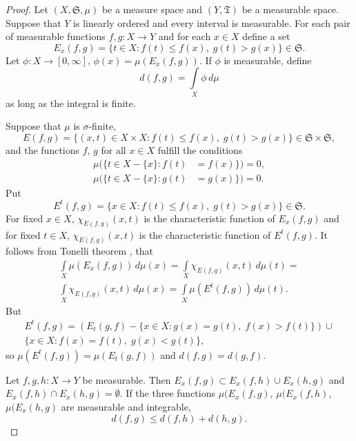 \begin{note}
\end{note}
\begin{proof}
Let $(X, \mathfrak{S}, \mu)$ be a measure space and $(Y,
\mathfrak{T})$ be a measurable space. Suppose that $Y$ is linearly
ordered and every interval is measurable. For each pair of measurable
functions $f, g \colon X \to Y$ and for each $x \in X$ define a set
\begin{equation*}
  E_x(f, g) = \{t \in X \colon f(t) \leq f(x), \; g(t) > g(x)\} \in
  \mathfrak{S}.
\end{equation*}
Let $\phi \colon X \to [0, \infty]$, $\phi(x) = \mu(E_x(f, g))$. If
$\phi$ is measurable, define
\begin{equation*}
  d(f, g) = \int \limits_{X} \phi \, d\mu
\end{equation*}
as long as the integral is finite.

Suppose that $\mu$ is $\sigma$-finite,
\begin{equation*}
  E(f, g) = \{(x, t) \in X \times X \colon f(t) \leq f(x), \; g(t) >
  g(x)\} \in \mathfrak{S} \times \mathfrak{S},
\end{equation*}
and the functions $f$, $g$ for all $x \in X$ fulfill the conditions
\begin{align*}
  \mu(\{t \in X - \{x\} \colon f(t) &= f(x)\}) = 0, \\
  \mu(\{t \in X - \{x\} \colon g(t) &= g(x)\}) = 0.
\end{align*}
Put
\begin{equation*}
  E^t(f, g) = \{x \in X \colon f(t) \leq f(x), \; g(t) > g(x)\} \in
  \mathfrak{S}.
\end{equation*}
For fixed $x \in X$, $\chi_{E(f, g)}(x, t)$ is the characteristic
function of $E_x(f, g)$ and for fixed $t \in X$, $\chi_{E(f, g)}(x,
t)$ is the characteristic function of $E^t(f, g)$. It follows from
Tonelli theorem \cite [\S7.6, \S7.8] {rudin-1986}, \cite [p.~231]
{billingsley-2009} that
\begin{equation*}
  \begin{split}
    \int \limits_{X} \mu(E_x(f, g)) \, d\mu(x) =
    \int \limits_{X} \chi_{E(f, g)}(x, t) \, d\mu(t) = \\
    \int \limits_{X} \chi_{E(f, g)}(x, t) \, d\mu(x) =
    \int \limits_{X} \mu(E^t(f, g)) \, d\mu(t).
  \end{split}
\end{equation*}
But
\begin{multline*}
  E^t(f, g) = \left( E_t(g, f) - \{x \in X \colon g(x) = g(t), \; f(x)
  > f(t)\} \right) \cup \\ \{x \in X \colon f(x) = f(t), \; g(x) <
  g(t)\},
\end{multline*}
so $\mu(E^t(f, g)) = \mu(E_t(g, f))$ and $d(f, g) = d(g, f)$.

Let $f, g, h \colon X \to Y$ be measurable. Then $E_x(f, g) \subset
E_x(f, h) \cup E_x(h, g)$ and $E_x(f, h) \cap E_x(h, g) = \emptyset$.
If the three functions $\mu(E_x(f, g)$, $\mu(E_x(f, h)$, $\mu(E_x(h,
g)$ are measurable and integrable,
\[
d(f, g) \leq d(f, h) + d(h, g).
\]
\end{proof}

